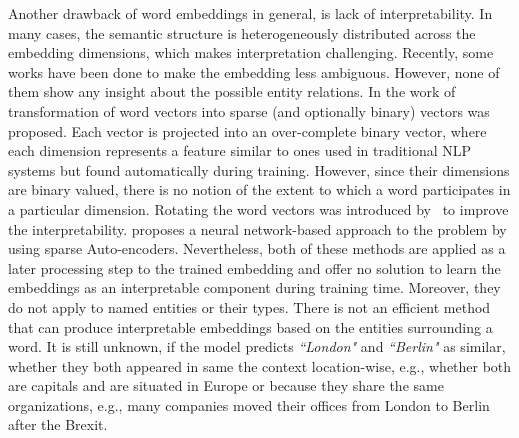 Another drawback of word embeddings in general, is lack of interpretability. In many cases, the semantic structure is heterogeneously distributed across the embedding dimensions, which makes interpretation challenging. Recently, some works have been done to make the embedding less ambiguous. However, none of them show any insight about the possible entity relations. In the work of~ transformation of word vectors into sparse (and optionally binary) vectors was proposed. Each vector is projected into an over-complete binary vector, where each dimension represents a feature similar to ones used in traditional NLP systems but found automatically during training. However, since their dimensions are binary valued, there is no notion of the extent to which a word participates in a particular dimension. Rotating the word vectors was introduced by~ to improve the interpretability.   proposes a neural network-based approach to the problem by using sparse Auto-encoders. Nevertheless, both of these methods are applied as a later processing step to the trained embedding and offer no solution to learn the embeddings as an interpretable component during training time. Moreover, they do not apply to named entities or their types. There is not an efficient method that can produce interpretable embeddings based on the entities surrounding a word. It is still unknown, if the model predicts \emph{``London"} and \emph{``Berlin"} as similar, whether they both appeared in same the context location-wise, e.g., whether both are capitals and are situated in Europe or because they share the same organizations, e.g., many companies moved their offices from London to Berlin after the Brexit. 

